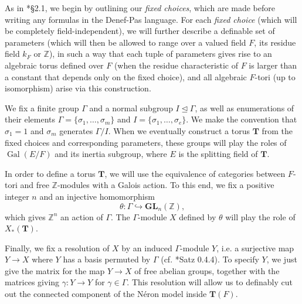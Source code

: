 \documentclass{amsart}
\newcommand{\Z}{{\mathbb Z}}
\newcommand{\GL}{\mathbf {GL}}
\newcommand{\bT}{\mathbf {T}}
\newcommand\spl{\mathrm{spl}}
\DeclareMathOperator{\Gal}{Gal}
\theoremstyle{plain}
\theoremstyle{definition}
\begin{document}
As in \cite{hales:transfert}*{\S 2.1}, we begin by outlining our \emph{fixed choices}, which are made before writing any formulas in the Denef-Pas language.  
For each \emph{fixed choice} (which will be completely field-independent), we will further describe a definable set of parameters (which will then be allowed to range over a valued field $F$, its residue field $k_F$ or $\Z$), in such a way that each tuple of parameters gives rise to an algebraic torus defined over $F$ (when the residue characteristic of $F$ is larger than a constant that depends only on the fixed choice), and all algebraic $F$-tori (up to isomorphism)  arise via this construction.  

We fix a finite group $\Gamma$ and a normal subgroup $I \unlhd \Gamma$, as well as enumerations of their elements $\Gamma = \{\sigma_1, \dots, \sigma_m\}$ and $I = \{\sigma_1, \dots, \sigma_e\}$.  We make the convention that $\sigma_1 = 1$ and $\sigma_m$ generates $\Gamma / I$.  When we eventually construct a torus $\bT$ from the fixed choices and corresponding parameters, these groups will play the roles of $\Gal(E/F)$ and its inertia subgroup, where $E$ is the splitting field of $\bT$.

In order to define a torus $\bT$, we will use the equivalence of categories between $F$-tori and free $\Z$-modules with a Galois action.  To this end, we fix a positive integer $n$ and an injective homomorphism
\begin{equation} \label{eq:theta}
\theta : \Gamma \hookrightarrow \GL_n(\Z),
\end{equation}
which gives $\Z^n$ an action of $\Gamma$.  The $\Gamma$-module $X$ defined by $\theta$ will play the role of $X_\ast(\bT)$.

Finally, we fix a resolution of $X$ by an induced $\Gamma$-module $Y$, i.e. a surjective map $Y \to X$ where $Y$ has a basis permuted by $\Gamma$ (cf. \cite{brahm:thesis}*{Satz 0.4.4}).  To specify $Y$, we just give the matrix for the map $Y \to X$ of free abelian groups, together with the matrices giving $\gamma : Y \to Y$ for $\gamma \in \Gamma$. This resolution will allow us to definably cut out the connected component of the N\'eron model inside $\bT(F)$.

\end{document}

